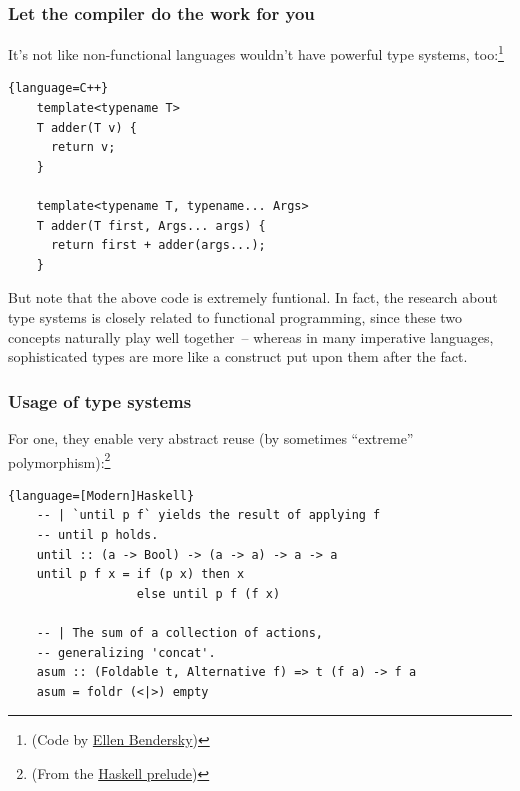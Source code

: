 \documentclass{beamer}
\begin{document}
\begin{frame}[containsverbatim]
  \frametitle{Let the compiler do the work for you} 

  It's not like non-functional languages wouldn't have powerful type systems, too:\footnote{%
    (Code by \href{http://eli.thegreenplace.net/2014/variadic-templates-in-c/}{Ellen Bendersky})}

  \begin{lstlisting}{language=C++}
    template<typename T>
    T adder(T v) {
      return v;
    }

    template<typename T, typename... Args>
    T adder(T first, Args... args) {
      return first + adder(args...);
    }
  \end{lstlisting}

  But note that the above code is extremely funtional. In fact, the research about type systems is
  closely related to functional programming, since these two concepts naturally play well
  together~-- whereas in many imperative languages, sophisticated types are more like a construct
  put upon them after the fact.
\end{frame}

\begin{frame}[containsverbatim]
  \frametitle{Usage of type systems}

  For one, they enable very abstract reuse (by sometimes \enquote{extreme} polymorphism):\footnote{%
    (From the
    \href{http://hackage.haskell.org/package/base-4.8.2.0/docs/Prelude.html\#v:sequence_}{%
      Haskell prelude})}
 
  \begin{lstlisting}{language=[Modern]Haskell}
    -- | `until p f` yields the result of applying f
    -- until p holds.
    until :: (a -> Bool) -> (a -> a) -> a -> a
    until p f x = if (p x) then x
                  else until p f (f x)

    -- | The sum of a collection of actions, 
    -- generalizing 'concat'.
    asum :: (Foldable t, Alternative f) => t (f a) -> f a
    asum = foldr (<|>) empty
  \end{lstlisting}


\end{frame}
\end{document}
